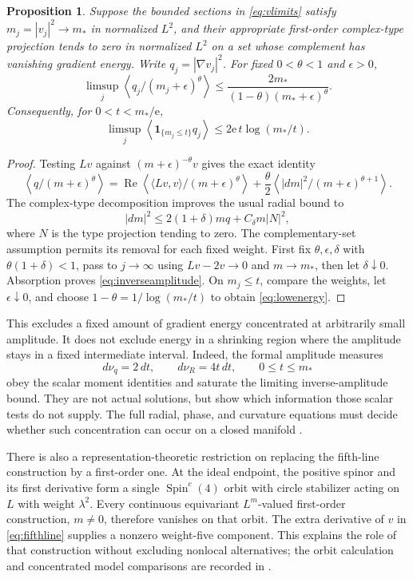 \documentclass[11pt,a4paper]{article}
\newtheorem{proposition}[theorem]{Proposition}
\theoremstyle{definition}
\theoremstyle{remark}
\newcommand{\Sc}{\operatorname{Spin}^{c}}
\newcommand{\av}[1]{\left\langle#1\right\rangle}
\begin{document}
\begin{proposition}\label{prop:low}
Suppose the bounded sections in \eqref{eq:vlimits} satisfy $m_j=|v_j|^2\to m_*$ in normalized $L^2$, and their appropriate first-order complex-type projection tends to zero in normalized $L^2$ on a set whose complement has vanishing gradient energy. Write $q_j=|\nabla v_j|^2$. For fixed $0<\theta<1$ and $\epsilon>0$,
\begin{equation}
 \limsup_j\av{q_j/(m_j+\epsilon)^\theta}
 \le\frac{2m_*}{(1-\theta)(m_*+\epsilon)^\theta}.
 \label{eq:inverseamplitude}
\end{equation}
Consequently, for $0<t<m_*/\mathrm e$,
\begin{equation}
 \limsup_j\av{\boldsymbol1_{\{m_j\le t\}}q_j}
 \le2\mathrm e\,t\log(m_*/t).
 \label{eq:lowenergy}
\end{equation}
\end{proposition}
\begin{proof}
Testing $Lv$ against $(m+\epsilon)^{-\theta}v$ gives the exact identity
\[
 \av{q/(m+\epsilon)^\theta}
 =\operatorname{Re}\av{\langle Lv,v\rangle/(m+\epsilon)^\theta}
 +\frac\theta2\av{|dm|^2/(m+\epsilon)^{\theta+1}}.
\]
The complex-type decomposition improves the usual radial bound to
\[
 |dm|^2\le2(1+\delta)mq+C_\delta m|N|^2,
\]
where $N$ is the type projection tending to zero. The complementary-set assumption permits its removal for each fixed weight. First fix $\theta,\epsilon,\delta$ with $\theta(1+\delta)<1$, pass to $j\to\infty$ using $Lv-2v\to0$ and $m\to m_*$, then let $\delta\downarrow0$. Absorption proves \eqref{eq:inverseamplitude}. On $m_j\le t$, compare the weights, let $\epsilon\downarrow0$, and choose $1-\theta=1/\log(m_*/t)$ to obtain \eqref{eq:lowenergy}.
\end{proof}

This excludes a fixed amount of gradient energy concentrated at arbitrarily small amplitude. It does not exclude energy in a shrinking region where the amplitude stays in a fixed intermediate interval. Indeed, the formal amplitude measures
\[
 d\nu_q=2\,dt,\qquad d\nu_R=4t\,dt,\qquad0\le t\le m_*
\]
obey the scalar moment identities and saturate the limiting inverse-amplitude bound. They are not actual solutions, but show which information those scalar tests do not supply. The full radial, phase, and curvature equations must decide whether such concentration can occur on a closed manifold \cite{Alternative}.

There is also a representation-theoretic restriction on replacing the fifth-line construction by a first-order one. At the ideal endpoint, the positive spinor and its first derivative form a single $\Sc(4)$ orbit with circle stabilizer acting on $L$ with weight $\lambda^2$. Every continuous equivariant $L^m$-valued first-order construction, $m\ne0$, therefore vanishes on that orbit. The extra derivative of $v$ in \eqref{eq:fifthline} supplies a nonzero weight-five component. This explains the role of that construction without excluding nonlocal alternatives; the orbit calculation and concentrated model comparisons are recorded in \cite{GapMap}.
\end{document}
